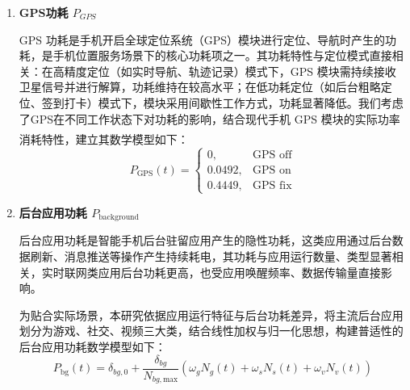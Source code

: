 \documentclass{mcmthesis}  %
\newcommand{\upcite}[1]{\textsuperscript{\textsuperscript{\cite{#1}}}}
\begin{document}
\begin{enumerate}[label=\arabic*.]
		其中，$P_{\text{network}}^{\text{network}}(\tau(t))$ 为网络的瞬时工作功率；$\tau(t)$ 网络负载强度（取值范围 $[0,1]$）；$a_{\text{network}}$ 为 Wi-Fi 网络负载功率系数，$b_{\text{network}}$ 为 Wi-Fi 网络基础工作功率，结合文献实测数据标定，取$a_{\text{Wi-Fi}}=0.18\mathrm{W}$，$b_{\text{Wi-Fi}}=0.08\mathrm{W}$，$a_{4\text{G}}=0.507\mathrm{W}$，$b_{4\text{G}}=0.15\mathrm{W}$，$a_{5\text{G}}=0.65\mathrm{W}$，$b_{5\text{G}}=0.15\mathrm{W}$。于是模型可简化为：
		
		\begin{equation}
			\begin{cases}
				P_{\text{network}}^{\text{Wi-Fi}}(\tau(t)) = 0.18\tau(t) + 0.08 \\
				P_{\text{network}}^{4\text{G}}(\tau(t)) = 0.507\tau(t) + 0.15 \\
				P_{\text{network}}^{5\text{G}}(\tau(t)) = 0.65\tau(t) + 0.15
			\end{cases}
		\end{equation}
		
		
		\item \textbf{GPS功耗 $P_{GPS}$}
		
		GPS 功耗是手机开启全球定位系统（GPS）模块进行定位、导航时产生的功耗，是手机位置服务场景下的核心功耗项之一。其功耗特性与定位模式直接相关：在高精度定位（如实时导航、轨迹记录）模式下，GPS 模块需持续接收卫星信号并进行解算，功耗维持在较高水平；在低功耗定位（如后台粗略定位、签到打卡）模式下，模块采用间歇性工作方式，功耗显著降低。我们考虑了GPS在不同工作状态下对功耗的影响，结合现代手机 GPS 模块的实际功率消耗特性，建立其数学模型如下\upcite{3}：
		\begin{equation}
			P_{\text{GPS}}(t) =
			\begin{cases}
				0, & \text{GPS off} \\
				0.0492, & \text{GPS on} \\
				0.4449, & \text{GPS fix}
			\end{cases}
		\end{equation}
		
		\item \textbf{后台应用功耗 $P_{\text{background}}$}
		
		后台应用功耗是智能手机后台驻留应用产生的隐性功耗，这类应用通过后台数据刷新、消息推送等操作产生持续耗电，其功耗与应用运行数量、类型显著相关，实时联网类应用后台功耗更高，也受应用唤醒频率、数据传输量直接影响。
		
		为贴合实际场景，本研究依据应用运行特征与后台功耗差异，将主流后台应用划分为游戏、社交、视频三大类，结合线性加权与归一化思想，构建普适性的后台应用功耗数学模型如下：
		\begin{equation}
			P_{\text{bg}}(t) = \delta_{bg,0} + \frac{\delta_{bg}}{N_{bg,\text{max}}} \left( \omega_g N_g(t) + \omega_s N_s(t) + \omega_v N_v(t) \right)
		\end{equation}
		

\end{enumerate}
\end{document}
